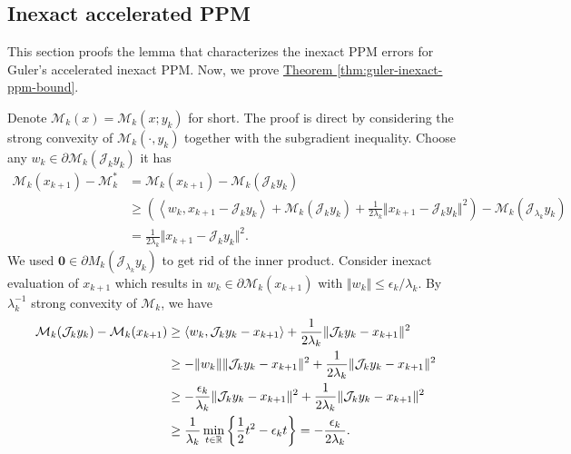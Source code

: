 \documentclass[12pt]{article}
\begin{document}
    \subsection{Inexact accelerated PPM}
        This section proofs the lemma that characterizes the inexact PPM errors for Guler's accelerated inexact PPM. 
        Now, we prove 
        \hyperref[thm:guler-inexact-ppm-bound]{Theorem \ref*{thm:guler-inexact-ppm-bound}}. 
                
        Denote $\mathcal M_k(x) = \mathcal M_k(x; y_k)$ for short. 
        The proof is direct by considering the strong convexity of $\mathcal M_k(\cdot, y_k)$ together with the subgradient inequality. 
        Choose any $w_k \in \partial \mathcal M_k(\mathcal J_{k} y_k)$ it has
        \begin{align*}
            \mathcal M_k(x_{k + 1}) - \mathcal M^*_k
            &= 
            \mathcal M_k(x_{k + 1}) - \mathcal M_k(\mathcal J_{k} y_k)
            \\
            &\ge 
            \left(
                \left\langle 
                    w_k, 
                    x_{k + 1} - \mathcal J_{k} y_k 
                \right\rangle
                + 
                \mathcal M_k(\mathcal J_{k}y_k)
                + \frac{1}{2\lambda_k}\Vert x_{k + 1} - \mathcal J_{k}y_k\Vert^2
            \right)
            - 
            \mathcal M_k(\mathcal J_{\lambda_k}y_k) 
            \\
            &= \frac{1}{2\lambda_k}\Vert x_{k +1} - \mathcal J_{k}y_k\Vert^2. 
        \end{align*}
        We used $\mathbf 0 \in \partial M_k(\mathcal J_{\lambda_k}y_k)$ to get rid of the inner product. 
        Consider inexact evaluation of $x_{k + 1}$ which results in $w_k \in \partial \mathcal M_k(x_{k + 1})$ with $\Vert w_k\Vert \le \epsilon_k/\lambda_k$. 
        By $\lambda_k^{-1}$ strong convexity of $\mathcal M_k$, we have 
        \begin{align*}
            \mathcal M_k(\mathcal J_{k}y_k) - \mathcal M_k(x_{k + 1})
            &\ge 
            \langle w_k, \mathcal J_{k}y_k - x_{k + 1}\rangle
            + \frac{1}{2\lambda_k}\Vert \mathcal J_{k} y_k - x_{k + 1}\Vert^2
            \\
            &\ge 
            - \Vert w_k\Vert\Vert \mathcal J_{k}y_k - x_{k + 1}\Vert^2
            + \frac{1}{2\lambda_k}\Vert \mathcal J_{k} y_k - x_{k + 1}\Vert^2
            \\
            &\ge 
            - \frac{\epsilon_k}{\lambda_k}\Vert \mathcal J_{k}y_k - x_{k + 1}\Vert^2
            + \frac{1}{2\lambda_k}\Vert \mathcal J_{k} y_k - x_{k + 1}\Vert^2
            \\
            &\ge \frac{1}{\lambda_k}
            \min_{t \in \mathbb R} \left\lbrace
                \frac{1}{2}t^2 - \epsilon_k t
            \right\rbrace = - \frac{\epsilon_k}{2\lambda_k}. 
        \end{align*}
\end{document}
